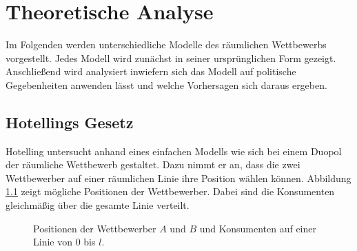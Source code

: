 \chapter{Theoretische Analyse}\label{Kap-Theorie}

\noindent
Im Folgenden werden unterschiedliche Modelle des räumlichen Wettbewerbs vorgestellt. Jedes Modell wird zunächst in seiner ursprünglichen Form gezeigt. Anschließend wird analysiert inwiefern sich das Modell auf politische Gegebenheiten anwenden lässt und welche Vorhersagen sich daraus ergeben.

\section{Hotellings Gesetz}\label{Sec-Hotelling}

Hotelling \citep{hotelling1929} untersucht anhand eines einfachen Modells wie sich bei einem Duopol der räumliche Wettbewerb gestaltet. Dazu nimmt er an, dass die zwei Wettbewerber auf einer räumlichen Linie ihre Position wählen können. Abbildung \ref{Fig-Linearer-Wettbewerb} zeigt mögliche Positionen der Wettbewerber. Dabei sind die Konsumenten gleichmäßig über die gesamte Linie verteilt.

\begin{figure}[htb]
	\centering
	\caption{Positionen der Wettbewerber $A$ und $B$ und Konsumenten auf einer Linie von $0$ bis $l$.}
	\label{Fig-Linearer-Wettbewerb}
\end{figure}

